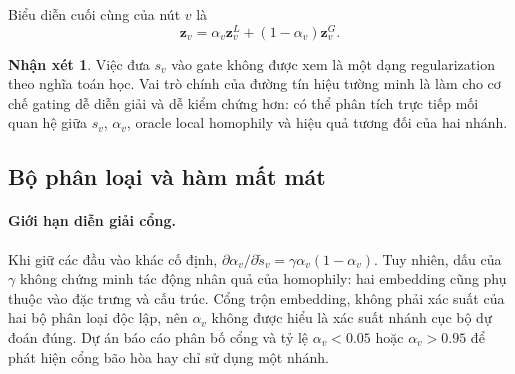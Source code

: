 \documentclass[12pt,a4paper]{article}
\numberwithin{equation}{section}
\theoremstyle{definition}
\newtheorem{remark}{Nhận xét}[section]
\begin{document}
Biểu diễn cuối cùng của nút $v$ là
\begin{equation}
\mathbf{z}_v = \alpha_v \mathbf{z}_v^L + (1 - \alpha_v)\mathbf{z}_v^G.
\end{equation}

\begin{remark}
Việc đưa $s_v$ vào gate không được xem là một dạng regularization theo nghĩa toán học. Vai trò chính của đường tín hiệu tường minh là làm cho cơ chế gating dễ diễn giải và dễ kiểm chứng hơn: có thể phân tích trực tiếp mối quan hệ giữa $s_v$, $\alpha_v$, oracle local homophily và hiệu quả tương đối của hai nhánh.
\end{remark}

\subsection{Bộ phân loại và hàm mất mát}
\paragraph{Giới hạn diễn giải cổng.}
Khi giữ các đầu vào khác cố định, $\partial\alpha_v/\partial\tilde{s}_v=\gamma\alpha_v(1-\alpha_v)$. Tuy nhiên, dấu của $\gamma$ không chứng minh tác động nhân quả của homophily: hai embedding cũng phụ thuộc vào đặc trưng và cấu trúc. Cổng trộn embedding, không phải xác suất của hai bộ phân loại độc lập, nên $\alpha_v$ không được hiểu là xác suất nhánh cục bộ dự đoán đúng. Dự án báo cáo phân bố cổng và tỷ lệ $\alpha_v<0.05$ hoặc $\alpha_v>0.95$ để phát hiện cổng bão hòa hay chỉ sử dụng một nhánh.
\end{document}
